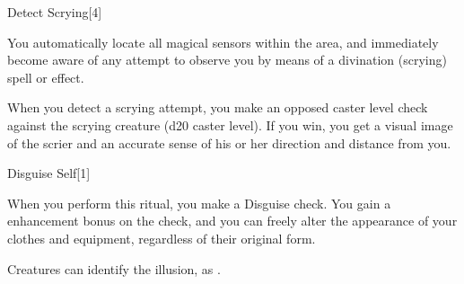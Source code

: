 \begin{spellsection}{Detect Scrying}[4]
    \begin{spellheader}
    \end{spellheader}
    \begin{spellcontent}
        \begin{spelltargetinginfo}
        \end{spelltargetinginfo}
        \begin{spelleffects}

            \spellline
            \spelleffect You automatically locate all magical sensors within the area, and immediately become aware of any attempt to observe you by means of a divination (scrying) spell or effect.

            \par When you detect a scrying attempt, you make an opposed caster level check against the scrying creature (d20 \add caster level). If you win, you get a visual image of the scrier and an accurate sense of his or her direction and distance from you.
            \spelldur \durext
        \end{spelleffects}
    \end{spellcontent}
    \begin{spellfooter}
    \end{spellfooter}
\end{spellsection}

\begin{spellsection}{Disguise Self}[1]
    \begin{spellheader}
    \end{spellheader}
    \begin{spellcontent}
        \begin{spelltargetinginfo}
        \end{spelltargetinginfo}
        \begin{spelleffects}

            \spelleffect When you perform this ritual, you make a Disguise check. You gain a  enhancement bonus on the check, and you can freely alter the appearance of your clothes and equipment, regardless of their original form.
            \spelldur \durlong \dismissable
        \end{spelleffects}
    \end{spellcontent}
    \begin{spellfooter}
        \spellnotes Creatures can identify the illusion, as .
    \end{spellfooter}
\end{spellsection}

